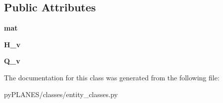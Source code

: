 \subsection*{Public Attributes}
\begin{DoxyCompactItemize}
\item 
\mbox{\label{classpy_p_l_a_n_e_s_1_1classes_1_1entity__classes_1_1_fluid_fem_aa12deb6c05820332adad7509067c14cc}} 
{\bfseries mat}
\item 
\mbox{\label{classpy_p_l_a_n_e_s_1_1classes_1_1entity__classes_1_1_fluid_fem_ac7f09f190b559f83968a4961037bdbdc}} 
{\bfseries H\+\_\+v}
\item 
\mbox{\label{classpy_p_l_a_n_e_s_1_1classes_1_1entity__classes_1_1_fluid_fem_af8cdfa08aa11586936f2ebe5e1f54193}} 
{\bfseries Q\+\_\+v}
\end{DoxyCompactItemize}


The documentation for this class was generated from the following file\+:\begin{DoxyCompactItemize}
\item 
py\+P\+L\+A\+N\+E\+S/classes/entity\+\_\+classes.\+py\end{DoxyCompactItemize}
